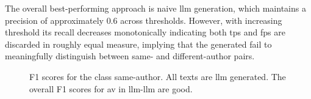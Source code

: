 The overall best-performing approach is naive \ac{llm} generation, which maintains a precision of approximately $0.6$ across thresholds.  
However, with increasing threshold its recall decreases monotonically indicating both \acp{tp} and \acp{fp} are discarded in roughly equal measure, implying that the generated \imps{} fail to meaningfully distinguish between same- and different-author pairs.


  \begin{figure}[h]
    \centering
    
    \caption{F1 scores for the class same-author.
  All texts are \ac{llm} generated.
  The overall F1 scores for \ac{av} in \ac{llm}-\ac{llm} are good.
  }
    \label{fig:llm-llm_f1}
  \end{figure}

